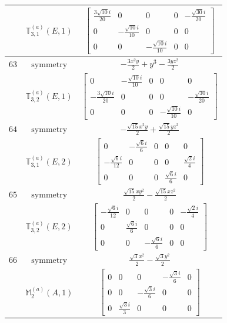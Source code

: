 \documentclass[fleqn,8pt,landscape]{jsarticle}
\begin{document}
\begin{longtable}{ccc}
$  $ & $ \mathbb{T}_{3,1}^{(a)}(E,1) $ & $ \begin{bmatrix} \frac{3 \sqrt{10} i}{20} & 0 & 0 & 0 & - \frac{\sqrt{30} i}{20} \\ 0 & - \frac{\sqrt{10} i}{10} & 0 & 0 & 0 \\ 0 & 0 & - \frac{\sqrt{10} i}{10} & 0 & 0 \end{bmatrix} $ \\ \hline
$ 63 $ & $ \text{symmetry} $ & $ - \frac{3 x^{2} y}{2} + y^{3} - \frac{3 y z^{2}}{2} $ \\
$  $ & $ \mathbb{T}_{3,2}^{(a)}(E,1) $ & $ \begin{bmatrix} 0 & - \frac{\sqrt{10} i}{10} & 0 & 0 & 0 \\ - \frac{3 \sqrt{10} i}{20} & 0 & 0 & 0 & - \frac{\sqrt{30} i}{20} \\ 0 & 0 & 0 & - \frac{\sqrt{10} i}{10} & 0 \end{bmatrix} $ \\ \hline
$ 64 $ & $ \text{symmetry} $ & $ - \frac{\sqrt{15} x^{2} y}{2} + \frac{\sqrt{15} y z^{2}}{2} $ \\
$  $ & $ \mathbb{T}_{3,1}^{(a)}(E,2) $ & $ \begin{bmatrix} 0 & - \frac{\sqrt{6} i}{6} & 0 & 0 & 0 \\ - \frac{\sqrt{6} i}{12} & 0 & 0 & 0 & \frac{\sqrt{2} i}{4} \\ 0 & 0 & 0 & \frac{\sqrt{6} i}{6} & 0 \end{bmatrix} $ \\ \hline
$ 65 $ & $ \text{symmetry} $ & $ \frac{\sqrt{15} x y^{2}}{2} - \frac{\sqrt{15} x z^{2}}{2} $ \\
$  $ & $ \mathbb{T}_{3,2}^{(a)}(E,2) $ & $ \begin{bmatrix} - \frac{\sqrt{6} i}{12} & 0 & 0 & 0 & - \frac{\sqrt{2} i}{4} \\ 0 & \frac{\sqrt{6} i}{6} & 0 & 0 & 0 \\ 0 & 0 & - \frac{\sqrt{6} i}{6} & 0 & 0 \end{bmatrix} $ \\ \hline
$ 66 $ & $ \text{symmetry} $ & $ \frac{\sqrt{3} x^{2}}{2} - \frac{\sqrt{3} y^{2}}{2} $ \\
$  $ & $ \mathbb{M}_{2}^{(a)}(A,1) $ & $ \begin{bmatrix} 0 & 0 & 0 & - \frac{\sqrt{3} i}{6} & 0 \\ 0 & 0 & - \frac{\sqrt{3} i}{6} & 0 & 0 \\ 0 & \frac{\sqrt{3} i}{3} & 0 & 0 & 0 \end{bmatrix} $ \\ \hline

\end{longtable}
\end{document}
